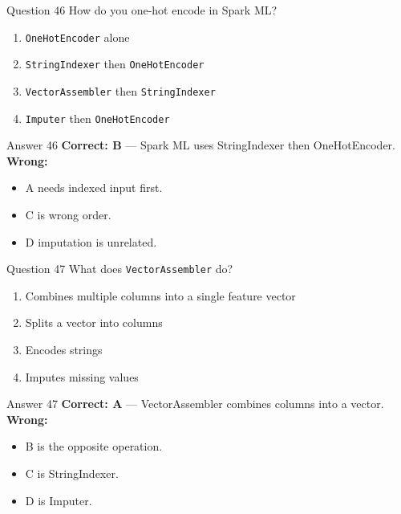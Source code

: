 \documentclass[aspectratio=169,11pt]{beamer}
\begin{document}
	\begin{frame}{Question 46}
		How do you one-hot encode in Spark ML?
		\begin{enumerate}[label=\Alph*.]
			\item \texttt{OneHotEncoder} alone
			\item \texttt{StringIndexer} then \texttt{OneHotEncoder}
			\item \texttt{VectorAssembler} then \texttt{StringIndexer}
			\item \texttt{Imputer} then \texttt{OneHotEncoder}
		\end{enumerate}
	\end{frame}
	\begin{frame}{Answer 46}
		\textbf{Correct: B} --- Spark ML uses StringIndexer then OneHotEncoder.\\
		\vspace{0.5em}
		\textbf{Wrong:}
		\begin{itemize}
			\item A needs indexed input first.
			\item C is wrong order.
			\item D imputation is unrelated.
		\end{itemize}
	\end{frame}
	
	\begin{frame}{Question 47}
		What does \texttt{VectorAssembler} do?
		\begin{enumerate}[label=\Alph*.]
			\item Combines multiple columns into a single feature vector
			\item Splits a vector into columns
			\item Encodes strings
			\item Imputes missing values
		\end{enumerate}
	\end{frame}
	\begin{frame}{Answer 47}
		\textbf{Correct: A} --- VectorAssembler combines columns into a vector.\\
		\vspace{0.5em}
		\textbf{Wrong:}
		\begin{itemize}
			\item B is the opposite operation.
			\item C is StringIndexer.
			\item D is Imputer.
		\end{itemize}
	\end{frame}
	
\end{document}
